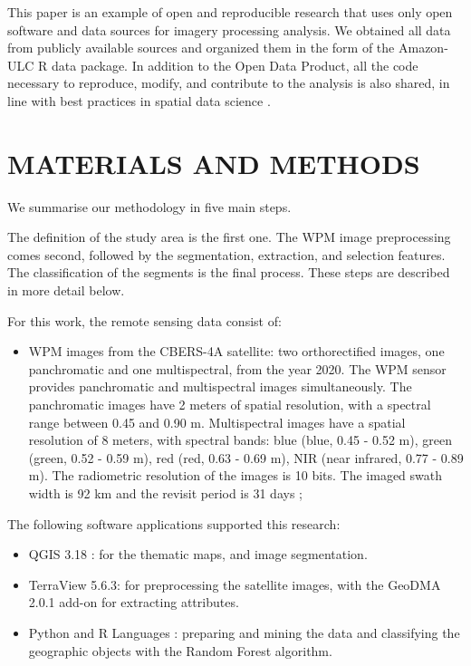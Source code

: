 \documentclass[preprint, 3p,
authoryear]{elsarticle} %
\providecommand{\tightlist}{%
  \setlength{\itemsep}{0pt}\setlength{\parskip}{0pt}}
\begin{document}
This paper is an example of open and reproducible research that uses
only open software and data sources for imagery processing analysis. We
obtained all data from publicly available sources and organized them in
the form of the Amazon-ULC R data package. In addition to the Open Data
Product, all the code necessary to reproduce, modify, and contribute to
the analysis is also shared, in line with best practices in spatial data
science \citep{brunsdon2021opening, DESJARDINS2022103091}.

\hypertarget{materials-and-methods}{%
\section{MATERIALS AND METHODS}\label{materials-and-methods}}

We summarise our methodology in five main steps.

The definition of the study area is the first one. The WPM image
preprocessing comes second, followed by the segmentation, extraction,
and selection features. The classification of the segments is the final
process. These steps are described in more detail below.

For this work, the remote sensing data consist of:

\begin{itemize}
\tightlist
\item
  WPM images from the CBERS-4A satellite: two orthorectified images, one
  panchromatic and one multispectral, from the year 2020. The WPM sensor
  provides panchromatic and multispectral images simultaneously. The
  panchromatic images have 2 meters of spatial resolution, with a
  spectral range between 0.45 and 0.90 \textmu m. Multispectral images
  have a spatial resolution of 8 meters, with spectral bands: blue
  (blue, 0.45 - 0.52 \textmu m), green (green, 0.52 - 0.59 \textmu m),
  red (red, 0.63 - 0.69 \textmu m), NIR (near infrared, 0.77 - 0.89
  \textmu m). The radiometric resolution of the images is 10 bits. The
  imaged swath width is 92 km and the revisit period is 31 days
  \citep{INPE2019};
\end{itemize}

The following software applications supported this research:

\begin{itemize}
\item
  QGIS 3.18 \citep{QGISTeam2021}: for the thematic maps, and image
  segmentation.
\item
  TerraView 5.6.3: for preprocessing the satellite images, with the
  GeoDMA 2.0.1 add-on \citep{Korting2013} for extracting attributes.
\item
  Python \citep{vanRossum1995} and R Languages \citep{R2022} : preparing
  and mining the data and classifying the geographic objects with the
  Random Forest algorithm.
\end{itemize}
\end{document}
